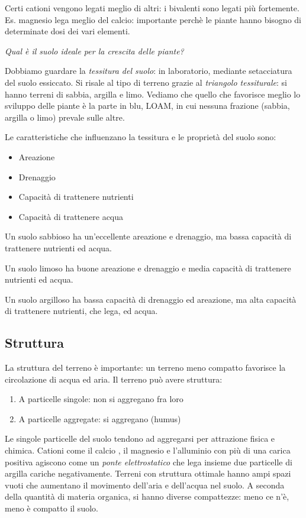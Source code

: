 \documentclass[a4paper,12pt]{book}
\begin{document}
Certi cationi vengono legati meglio di altri: i bivalenti sono legati più fortemente. Es. magnesio lega meglio del calcio: importante perchè le piante hanno bisogno di determinate dosi dei vari elementi. 

\emph{Qual è il suolo ideale per la crescita delle piante?}

Dobbiamo guardare la \emph{tessitura del suolo}: in laboratorio, mediante setacciatura del suolo essiccato. Si risale al tipo di terreno grazie al \emph{triangolo tessiturale}: si hanno terreni di sabbia, argilla e limo. Vediamo che quello che favorisce meglio lo sviluppo delle piante è la parte in blu, LOAM, in cui nessuna frazione (sabbia, argilla o limo) prevale sulle altre.

Le caratteristiche che influenzano la tessitura e le proprietà del suolo sono:
\begin{itemize}
\item{Areazione}
\item{Drenaggio}
\item{Capacità di trattenere nutrienti}
\item{Capacità di trattenere acqua}
\end{itemize}

Un suolo sabbioso ha un'eccellente areazione e drenaggio, ma bassa capacità di trattenere nutrienti ed acqua.

Un suolo limoso ha buone areazione e drenaggio e media capacità di trattenere nutrienti ed acqua.

Un suolo argilloso ha bassa capacità di drenaggio ed areazione, ma alta capacità di trattenere nutrienti, che lega, ed acqua.
\subsection{Struttura}
La struttura del terreno è importante: un terreno meno compatto favorisce la circolazione di acqua ed aria. Il terreno può avere struttura:
\begin{enumerate}
\item{A particelle singole: non si aggregano fra loro}
\item{A particelle aggregate: si aggregano (humus)}
\end{enumerate}

Le singole particelle del suolo tendono ad aggregarsi per attrazione fisica e chimica. Cationi come il calcio , il magnesio e l’alluminio con più di una carica positiva agiscono come un \emph{ponte elettrostatico} che lega insieme due particelle di argilla cariche negativamente. Terreni con struttura ottimale hanno ampi spazi vuoti che aumentano il movimento dell’aria e dell’acqua nel suolo.
A seconda della quantità di materia organica, si hanno diverse compattezze: meno ce n'è, meno è compatto il suolo.
\end{document}
